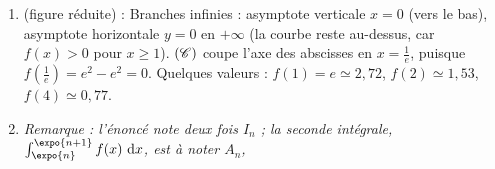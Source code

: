 \begin{enumerate}
\begin{enumerate}
            $f'(x) = -\frac{e}{x^2} + \frac{1 - 2\ln x}{x^3} = \frac{-ex + 1 - 2\ln x}{x^3}$, 
         \item {} $x^3 > 0$, donc $f'(x)$ a le signe de $g(x)$.
            \[
               \begin{array}{c|ccccc}
                  x & 0 & & \alpha & & +\infty \\ \hline
                  f'(x) & & + & 0 & - & \\ \hline
                  & & & f(\alpha) & & \\
                  f & & \nearrow & & \searrow & \\
                  & -\infty & & & & 0
               \end{array}
            \]
      \end{enumerate}
   \item {} (figure r\'eduite) :
      Branches infinies : asymptote verticale $x = 0$ (vers le bas), asymptote horizontale $y = 0$ en $+\infty$ (la courbe reste au-dessus, car $f(x) > 0$ pour $x \geq 1$).
      $(\mathscr{C})$ coupe l'axe des abscisses en $x = \frac{1}{e}$, puisque $f\left(\frac{1}{e}\right) = e^2 - e^2 = 0$.
      Quelques valeurs : $f(1) = e \simeq 2{,}72$, $f(2) \simeq 1{,}53$, $f(4) \simeq 0{,}77$.
      \begin{center}
      \end{center}
   \item
      \emph{Remarque : l'\'enonc\'e note deux fois $I_n$ ; la seconde int\'egrale, $\int_{\expo{n}}^{\expo{n+1}} f(x)\dx$, est \`a noter $A_n$,
}
\end{enumerate}
